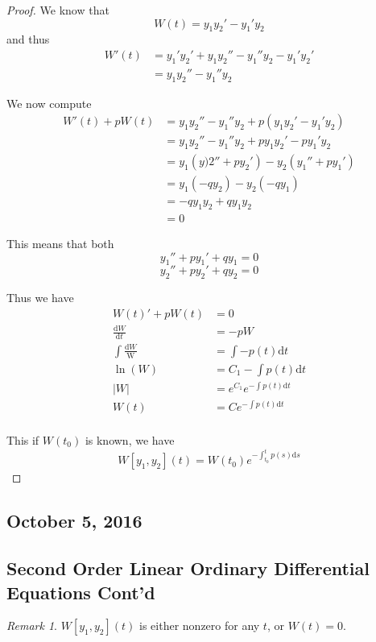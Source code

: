 \documentclass[11pt]{article}
\theoremstyle{plain} %
\theoremstyle{definition}
\theoremstyle{example}
\theoremstyle{remark}
\newtheorem*{remark}{Remark}
\begin{document}
\begin{proof}
We know that $$W(t) = y_1y_2' - y_1' y_2$$ and thus 
\begin{align*}
	W'(t) &= y_1'y_2' + y_1y_2''-y_1''y_2-y_1'y_2' \\
	&= y_1y_2'' - y_1''y_2
\end{align*}

We now compute 
\begin{align*}
	W'(t) + pW(t) &= y_1y_2'' -y_1''y_2+p\left(y_1y_2' - y_1'y_2\right)\\
	&= y_1y_2'' - y_1''y_2 + py_1y_2' - py_1'y_2 \\
	&= y_1\left(y)2''+py_2'\right) - y_2\left(y_1''+py_1'\right)\\
	&= y_1(-qy_2)-y_2(-qy_1)\\
	&= -qy_1y_2+qy_1y_2\\
	&= 0
\end{align*}

This means that both 
$$y_1'' + py_1' + qy_1 = 0$$
$$y_2'' + py_2' + qy_2 = 0$$

Thus we have
\begin{align*}
W(t)' + pW(t) &= 0\\
\frac{\mathrm d W}{\mathrm d t} &= -pW\\
\int \frac{\mathrm d W}{\mathrm W}  &= \int -p(t) \mathrm d t\\
\ln(W) &= C_1-\int p(t)\mathrm d t\\
|W| &= e^{C_1}e^{-\int p(t) \mathrm d t}\\
W(t) &= Ce^{-\int p(t) \mathrm d t} \\
\end{align*}

This if $W(t_0)$ is known, we have $$W[y_1, y_2](t) = W(t_0)e^{-\int_{t_0}^tp(s) \mathrm d s}$$
\end{proof}

\subsection{October 5, 2016}
\subsection{Second Order Linear Ordinary Differential Equations Cont'd}

\begin{remark}
$W[y_1, y_2](t)$ is either nonzero for any $t$, or $W(t) = 0$. 
\end{remark}
\end{document}

